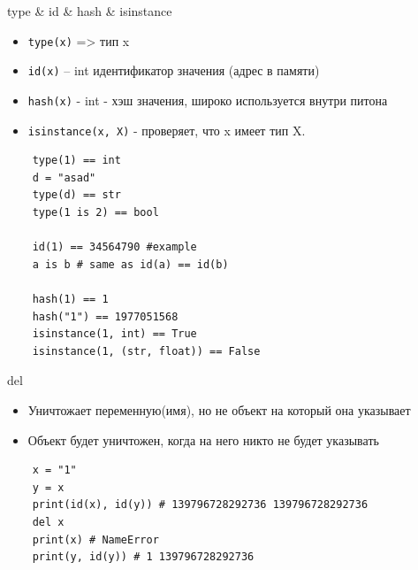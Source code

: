 \documentclass{article}
\begin{document}
\begin{center} type \& id \& hash \& isinstance \end{center}
\begin{itemize}
	\item \lstinline!type(x)! => тип x
	\item \lstinline!id(x)! – int идентификатор значения (адрес в памяти)
	\item \lstinline!hash(x)! - int - хэш значения, широко используется внутри питона
	\item \lstinline!isinstance(x, X)! - проверяет, что x имеет тип X.
\end{itemize}
\vspace{15pt}
\begin{lstlisting}
	type(1) == int
	d = "asad"
	type(d) == str
	type(1 is 2) == bool

	id(1) == 34564790 #example
	a is b # same as id(a) == id(b)

	hash(1) == 1
	hash("1") == 1977051568
	isinstance(1, int) == True
	isinstance(1, (str, float)) == False
\end{lstlisting}
\newpage

\begin{center} del \end{center}
\begin{itemize}
	\item Уничтожает переменную(имя), но не объект на который она указывает
	\item Объект будет уничтожен, когда на него никто не будет указывать
\end{itemize}
\begin{lstlisting}
	x = "1"
	y = x
	print(id(x), id(y)) # 139796728292736 139796728292736
	del x
	print(x) # NameError
	print(y, id(y)) # 1 139796728292736
\end{lstlisting}
\newpage

\end{document}
